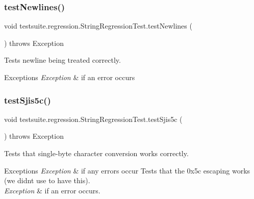 \subsubsection{\texorpdfstring{test\+Newlines()}{testNewlines()}}
{\footnotesize\ttfamily void testsuite.\+regression.\+String\+Regression\+Test.\+test\+Newlines (\begin{DoxyParamCaption}{ }\end{DoxyParamCaption}) throws Exception}

Tests newline being treated correctly.


\begin{DoxyExceptions}{Exceptions}
{\em Exception} & if an error occurs \\
\hline
\end{DoxyExceptions}
\mbox{\label{classtestsuite_1_1regression_1_1_string_regression_test_a79556638c7ab71bef596c339006c2e19}} 
\subsubsection{\texorpdfstring{test\+Sjis5c()}{testSjis5c()}}
{\footnotesize\ttfamily void testsuite.\+regression.\+String\+Regression\+Test.\+test\+Sjis5c (\begin{DoxyParamCaption}{ }\end{DoxyParamCaption}) throws Exception}

Tests that single-\/byte character conversion works correctly.


\begin{DoxyExceptions}{Exceptions}
{\em Exception} & if any errors occur Tests that the 0x5c escaping works (we didn\textquotesingle{}t use to have this).\\
\hline
{\em Exception} & if an error occurs. \\
\hline
\end{DoxyExceptions}
\mbox{\label{classtestsuite_1_1regression_1_1_string_regression_test_a4f3f125a39d60c4abe46d69db6002ede}} 

